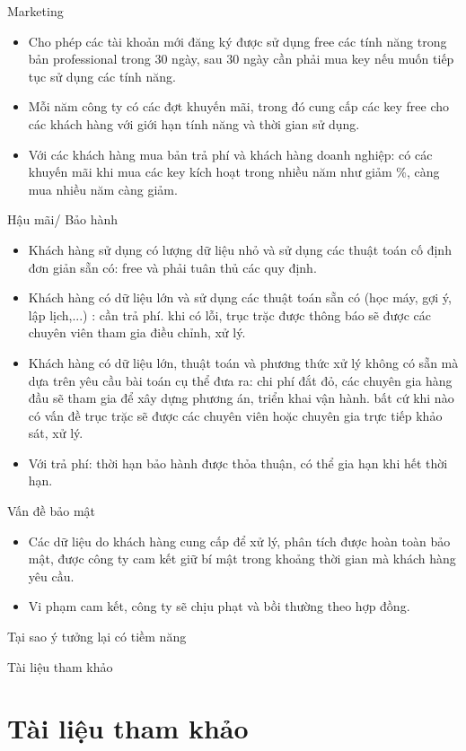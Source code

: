 \documentclass{beamer}
\begin{document}
\begin{frame}{Marketing}
\begin{itemize}
\item Cho phép các tài khoản mới đăng ký được sử dụng free các tính năng trong bản professional trong 30 ngày, sau 30 ngày cần phải mua key nếu muốn tiếp tục sử dụng các tính năng.
\item Mỗi năm công ty có các đợt khuyến mãi, trong đó cung cấp các key free cho các khách hàng với giới hạn tính năng và thời gian sử dụng.
\item Với các khách hàng mua bản trả phí và khách hàng doanh nghiệp: có các khuyến mãi khi mua các key kích hoạt trong nhiều năm như giảm \%, càng mua nhiều năm càng giảm.

\end{itemize}

\end{frame}
\begin{frame}{Hậu mãi/ Bảo hành}
\begin{itemize}
\item Khách hàng sử dụng có lượng dữ liệu nhỏ và sử dụng các thuật toán cố định đơn giản sẵn có: free và phải tuân thủ các quy định.
\item Khách hàng có dữ liệu lớn và sử dụng các thuật toán sẵn có (học máy, gợi ý, lập lịch,...) : cần trả phí. khi có lỗi, trục trặc được thông báo sẽ được các chuyên viên tham gia điều chỉnh, xử lý.
\item Khách hàng có dữ liệu lớn, thuật toán và phương thức xử lý không có sẵn mà dựa trên yêu cầu bài toán cụ thể đưa ra: chi phí đắt đỏ, các chuyên gia hàng đầu sẽ tham gia để xây dựng phương án, triển khai vận hành. bất cứ khi nào có vấn đề trục trặc sẽ được các chuyên viên hoặc chuyên gia trực tiếp khảo sát, xử lý.
\item Với trả phí: thời hạn bảo hành được thỏa thuận, có thể gia hạn khi hết thời hạn.

\end{itemize}
\end{frame}
\begin{frame}{Vấn đề bảo mật}
\begin{itemize}
\item Các dữ liệu do khách hàng cung cấp để xử lý, phân tích được hoàn toàn bảo mật, được công ty cam kết giữ bí mật trong khoảng thời gian mà khách hàng yêu cầu.
\item Vi phạm cam kết, công ty sẽ chịu phạt và bồi thường theo hợp đồng.

\end{itemize}
\end{frame}
\begin{frame}{Tại sao ý tưởng lại có tiềm năng}
\end{frame}
\begin{frame}{Tài liệu tham khảo}
\section*{Tài liệu tham khảo}

\end{frame}
\end{document}
